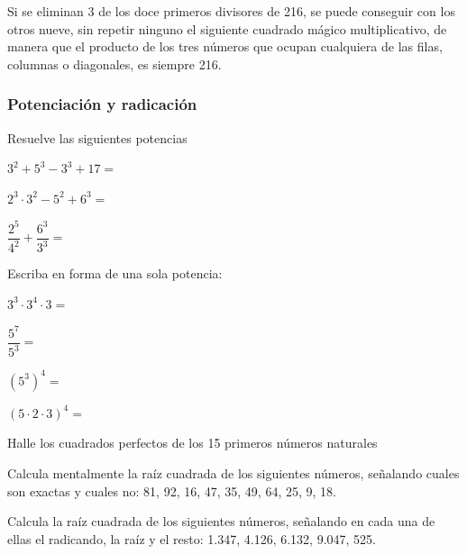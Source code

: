 \documentclass[letterpaper,11pt,twoside]{article}
\begin{document}
\begin{enumerate}
\begin{minipage}{.6\textwidth}
\item Si se eliminan 3 de los doce primeros divisores de 216, se puede conseguir con los otros nueve, sin repetir ninguno el siguiente cuadrado mágico multiplicativo, de manera que el producto de los tres números que ocupan cualquiera de las filas, columnas o diagonales, es siempre 216.
\end{minipage} \hfill
\begin{minipage}{.35\textwidth}
\end{minipage}
\subsubsection*{Potenciación y radicación}
\item Resuelve las siguientes potencias
\begin{enumerate}
\begin{multicols}{3}
\item $3^{2}+5^{3}-3^{3}+17=$
\item $2^{3}\cdot 3^{2}-5^{2}+6^{3}=$
\item $\dfrac{2^{5}}{4^{2}}+\dfrac{6^{3}}{3^{3}}=$
\end{multicols}
\end{enumerate}
\item Escriba en forma de una sola potencia:
\begin{enumerate}
\begin{multicols}{2}
\item $3^{3}\cdot 3^{4}\cdot 3=$
\item $\dfrac{5^{7}}{5^{3}}=$
\item $(5^{3})^{4}=$
\item $(5\cdot 2 \cdot 3)^{4}=$
\end{multicols}
\end{enumerate}
\item Halle los cuadrados perfectos de los 15 primeros números naturales
\item Calcula mentalmente la raíz cuadrada de los siguientes números, señalando cuales son exactas y cuales no: 81, 92, 16, 47, 35, 49, 64, 25, 9, 18.
\item Calcula la raíz cuadrada de los siguientes números, señalando en cada una de ellas el radicando, la raíz y el resto: 1.347, 4.126, 6.132, 9.047, 525.

\end{enumerate}
\end{document}

